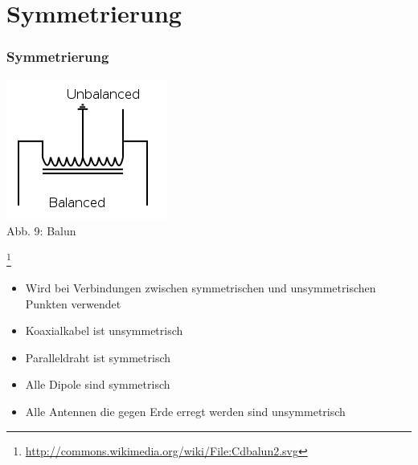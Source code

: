 \section*{Symmetrierung}
\begin{frame}
\frametitle{Symmetrierung}
\begin{minipage}{0.3\textwidth}
	\includegraphics[scale=0.5]{e10/balun.png}\\
	Abb. 9: Balun

\end{minipage}
	\footnote{\url{http://commons.wikimedia.org/wiki/File:Cdbalun2.svg}}
\begin{minipage}{0.6\textwidth}
	\begin{itemize}
		\item Wird bei Verbindungen zwischen symmetrischen und unsymmetrischen Punkten verwendet
		\item Koaxialkabel ist unsymmetrisch
		\item Paralleldraht ist symmetrisch
		\item Alle Dipole sind symmetrisch
		\item Alle Antennen die gegen Erde erregt werden sind unsymmetrisch
	\end{itemize}
\end{minipage}
\end{frame}

